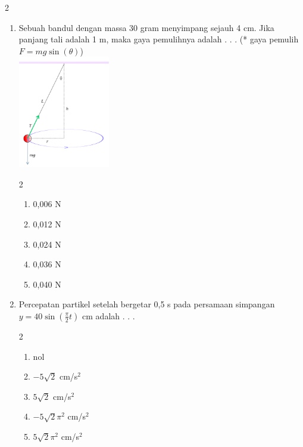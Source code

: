 \documentclass[10pt,a4paper]{extarticle}
\newcommand{\pilgani}[1]{                            \vspace{-0.3cm}\begin{multicols}{2}
 \begin{enumerate}[label=\Alph*., itemsep=0pt,topsep=0pt,leftmargin=*,align=Center]#1                     \end{enumerate}
 \phantom{ini cuma sapi, wedus, dan ayam}
 \end{multicols}}
\begin{document}
\begin{multicols*}{2}
\begin{enumerate}
   \item Sebuah bandul dengan massa 30 gram menyimpang sejauh 4 cm. Jika panjang tali adalah 1 m, maka gaya pemulihnya adalah . . . (* gaya pemulih $F=mg \sin (\theta)$)\\ 
\includegraphics[width=4cm]{pic/pendulum} 
\pilgani{ \item 0,006 N
   \item 0,012 N
   \item 0,024 N
   \item 0,036 N
   \item 0,040 N
   }
   \vspace{2cm}

\item Percepatan partikel setelah bergetar 0,5 s pada persamaan simpangan $y = 40 \sin (\frac{\pi}{2}t)$ cm  adalah . . .
\pilgani{
   \item nol
   \item $-5\sqrt{2}$ cm/s$^2$
   \item $5\sqrt{2}$ cm/s$^2$
   \item $-5\sqrt{2}\pi^2$ cm/s$^2$
   \item $5\sqrt{2}\pi^2$ cm/s$^2$
}
\end{enumerate}
\end{multicols*}
\end{document}
